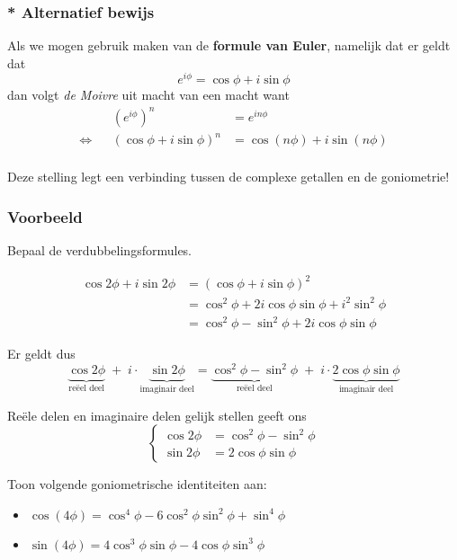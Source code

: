 \documentclass[12pt,twoside,a4paper]{article}
\begin{document}
\subsubsection*{* Alternatief bewijs}
Als we mogen gebruik maken van de {\bf formule van Euler}, namelijk dat er geldt dat
\[e^{i\phi} = \cos\phi + i\sin\phi \]
dan volgt {\em de Moivre} uit macht van een macht want
\begin{align*}
     && \left(e^{i\phi}\right)^n &= e^{in\phi}\\
  \Leftrightarrow && (\cos \phi + i \sin \phi)^n &= \cos( n\phi ) + i\sin( n\phi )\\
\end{align*}

Deze stelling legt een verbinding tussen de complexe getallen en de goniometrie!

\subsubsection*{Voorbeeld}

Bepaal de verdubbelingsformules.

\begin{align*}
  \cos 2\phi + i \sin 2\phi &= (\cos \phi + i \sin \phi)^2\\
                      &= \cos^2 \phi + 2i\cos\phi\sin\phi + i^2\sin^2\phi\\
                      &= \cos^2\phi - \sin^2\phi + 2i\cos\phi\sin\phi
\end{align*}

Er geldt dus
\[ \underbrace{\cos 2\phi}_{\text{reëel deel}} \;+ \;i \cdot \underbrace{\sin 2\phi}_{\text{imaginair deel}}
  = \underbrace{\cos^2\phi - \sin^2\phi}_{\text{reëel deel}} \; + \; i \cdot \underbrace{2\cos\phi\sin\phi}_{\text{imaginair deel}} \]

Reële delen en imaginaire delen gelijk stellen geeft ons
\[
  \begin{cases}
    \cos 2\phi &= \cos^2\phi - \sin^2\phi \\
    \sin 2\phi &= 2 \cos\phi \sin\phi
  \end{cases}
\]

\begin{oefening}
  Toon volgende goniometrische identiteiten aan:
  \begin{itemize}
  \item $\cos(4\phi) = \cos^4\phi - 6 \cos^2\phi \sin^2\phi + \sin^4\phi $
  \item $\sin(4\phi) = 4\cos^3\phi \sin\phi - 4 \cos\phi \sin^3\phi $
  \end{itemize}
\end{oefening}
\end{document}
